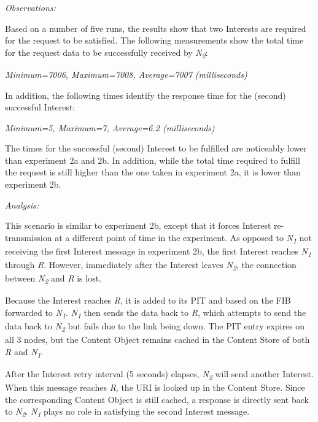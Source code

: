 \documentclass[a4paper,12pt]{report}      %
\begin{document}
\vspace*{1\baselineskip}\noindent\emph{Observations:}

Based on a number of five runs, the results show that two Interests are required for the request to be
satisfied. The following measurements show the total time for the request data to be successfully
received by \emph{N\textsubscript{2}}:

\begin{center}\textsl{Minimum=7006, Maximum=7008, Average=7007 (milliseconds)}\end{center}

In addition, the following times identify the response time for the (second) successful Interest:

\begin{center}\textsl{Minimum=5, Maximum=7, Average=6.2 (milliseconds)}\end{center}

The times for the successful (second) Interest to be fulfilled are noticeably lower than experiment 2a
and 2b. In addition, while the total time required to fulfill the request is still higher than the one taken
in experiment 2a, it is lower than experiment 2b.

\vspace*{1\baselineskip}\noindent\emph{Analysis:}

This scenario is similar to experiment 2b, except that it forces Interest re-transmission at a different
point of time in the experiment. As opposed to \emph{N\textsubscript{1}} not receiving the first Interest message
in experiment 2b, the first Interest reaches \emph{N\textsubscript{1}} through \emph{R}. However, immediately after the
Interest leaves \emph{N\textsubscript{2}}, the connection between \emph{N\textsubscript{2}} and \emph{R} is lost.

Because the Interest reaches \emph{R}, it is added to its PIT and based on the FIB forwarded to \emph{N\textsubscript{1}}.
\emph{N\textsubscript{1}} then sends the data back to \emph{R}, which attempts to send the data back to \emph{N\textsubscript{2}} but
fails due to the link being down. The PIT entry expires on all 3 nodes, but the Content Object
remains cached in the Content Store of both \emph{R} and \emph{N\textsubscript{1}}.

After the Interest retry interval (5 seconds) elapses, \emph{N\textsubscript{2}} will send another Interest. When this
message reaches \emph{R}, the URI is looked up in the Content Store. Since the corresponding Content
Object is still cached, a response is directly sent back to \emph{N\textsubscript{2}}. \emph{N\textsubscript{1}} plays no
 role in satisfying the second Interest message.
\end{document}
